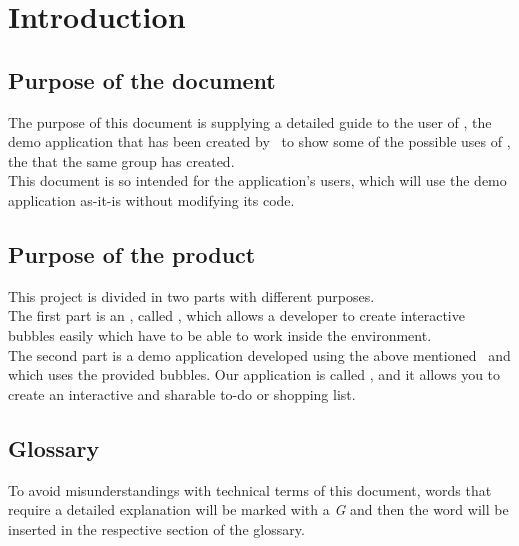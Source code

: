 \section{Introduction}

\subsection{Purpose of the document}
The purpose of this document is supplying a detailed guide to the user of \app, the demo application that has been created by \gruppo\ to show some of the possible uses of \progetto, the  that the same group has created. \\
This document is so intended for the application's users, which will use the demo application as-it-is without modifying its code.

\subsection{Purpose of the product}
This project is divided in two parts with different purposes. \\
The first part is an , called \progettoShort, which allows a developer to create interactive bubbles easily which have to be able to work inside the  environment. \\
The second part is a demo application developed using the above mentioned \progettoShort\ and which uses the provided bubbles. Our application is called \app, and it allows you to create an interactive and sharable to-do or shopping list.

\subsection{Glossary}
To avoid misunderstandings with technical terms of this document, words that require a detailed explanation will be marked with a \textit{G} and then the word will be inserted in the respective section of the glossary.

\newpage